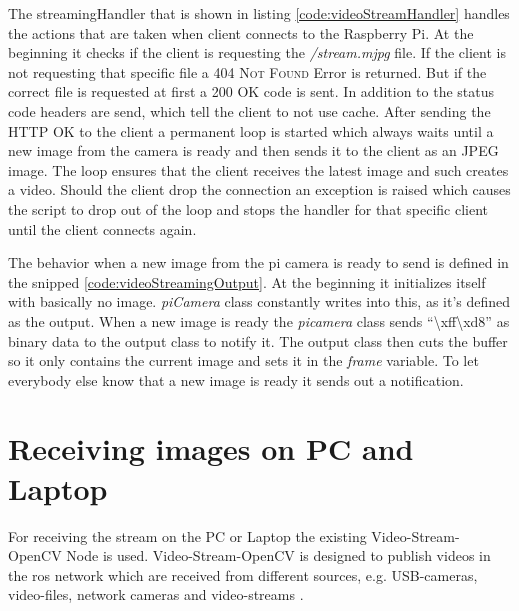 The streamingHandler that is shown in listing \ref{code:videoStreamHandler} handles the actions that are taken when client connects to the Raspberry Pi. At the beginning it checks if the client is requesting the \textit{/stream.mjpg} file. If the client is not requesting that specific file a \textsc{404 Not Found} Error is returned. But if the correct file is requested at first a \textsc{200 OK} code is sent. In addition to the status code headers are send, which tell the client to not use cache. After sending the \textsc{HTTP OK} to the client a permanent loop is started which always waits until a new image from the camera is ready and then sends it to the client as an JPEG image. The loop ensures that the client receives the latest image and such creates a video. Should the client drop the connection an exception is raised which causes the script to drop out of the loop and stops the handler for that specific client until the client connects again.\newline


The behavior when a new image from the pi camera is ready to send is defined in the snipped \ref{code:videoStreamingOutput}. At the beginning it initializes itself with basically no image. \textit{piCamera} class constantly writes into this, as it's defined as the output. When a new image is ready the \textit{picamera} class sends \enquote{\textbackslash xff\textbackslash xd8} as binary data to the output class to notify it. The output class then cuts the buffer so it only contains the current image and sets it in the \textit{frame} variable. To let everybody else know that a new image is ready it sends out a notification.\newline



\section{Receiving images on PC and Laptop\authorA}
For receiving the stream on the PC or Laptop the existing Video-Stream-OpenCV Node is used. Video-Stream-OpenCV is designed to publish videos in the \gls{ros} network which are received from different sources, e.g. USB-cameras, video-files, network cameras and video-streams \cite{videostreamopencv}.


